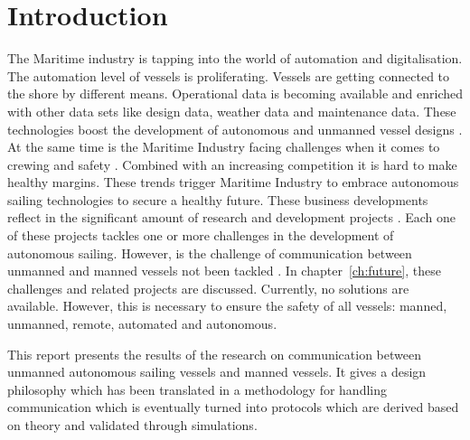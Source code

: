 \chapter*{Introduction}
\label{sec:introduction}

The Maritime industry is tapping into the world of automation and digitalisation. The automation level of vessels is proliferating. Vessels are getting connected to the shore by different means. Operational data is becoming available and enriched with other data sets like design data, weather data and maintenance data. These technologies boost the development of autonomous and unmanned vessel designs \cite{Blanke2017}. 
At the same time is the Maritime Industry facing challenges when it comes to crewing and safety \cite{Cappelle2018}. Combined with an increasing competition it is hard to make healthy margins. These trends trigger Maritime Industry to embrace autonomous sailing technologies to secure a healthy future. These business developments reflect in the significant amount of research and development projects \cite{SMASH2017} \cite{Eriksen2017} \cite{MUNIN2016} \cite{Sames2017} \cite{RollsRoyce2015} \cite{Waterborne2016}. Each one of these projects tackles one or more challenges in the development of autonomous sailing. However, is the challenge of communication between unmanned and manned vessels not been tackled \cite{Saarni2018}. In chapter~\ref{ch:future}, these challenges and related projects are discussed. Currently, no solutions are available. However, this is necessary to ensure the safety of all vessels: manned, unmanned, remote, automated and autonomous.

This report presents the results of the research on communication between unmanned autonomous sailing vessels and manned vessels. It gives a design philosophy which has been translated in a methodology for handling communication which is eventually turned into protocols which are derived based on theory and validated through simulations.



